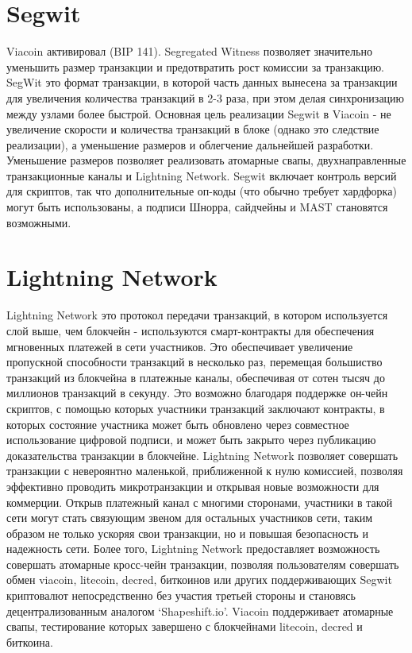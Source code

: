 \documentclass{article}
\begin{document}
\section{Segwit}\label{sec: Segwit}
Viacoin активировал \cite{segwit} (BIP 141). Segregated Witness позволяет
значительно уменьшить размер транзакции и предотвратить рост комиссии за транзакцию.
SegWit это формат транзакции, в которой часть данных вынесена за транзакции для
увеличения количества транзакций в 2-3 раза, при этом делая синхронизацию между
узлами более быстрой.
\newline \newline \noindent
Основная цель реализации Segwit в Viacoin - не увеличение скорости и количества
транзакций в блоке (однако это следствие реализации), а уменьшение размеров
 и облегчение дальнейшей разработки. Уменьшение размеров позволяет реализовать
 \cite{atomic}атомарные свапы, двухнаправленные транзакционные каналы и Lightning Network.
\newline \newline \noindent
Segwit включает контроль версий для скриптов, так что дополнительные оп-коды
(что обычно требует хардфорка) могут быть использованы, а подписи Шнорра,
сайдчейны и MAST становятся возможными.

\section{Lightning Network}\label{sec: The Lightning Network}
\cite{lightningNetwork} Lightning Network это протокол передачи транзакций, в котором используется
слой выше, чем блокчейн - используются смарт-контракты для обеспечения мгновенных
платежей в сети участников.
Это обеспечивает увеличение пропускной способности транзакций в несколько раз,
перемещая большиство транзакций из блокчейна в платежные каналы, обеспечивая
от сотен тысяч до миллионов транзакций в секунду. Это возможно благодаря поддержке
он-чейн скриптов, с помощью которых участники транзакций заключают контракты, в которых
состояние участника может быть обновлено через совместное использование цифровой
подписи, и может быть закрыто через публикацию доказательства транзакции в блокчейне.
\newline \newline \noindent
Lightning Network позволяет совершать транзакции с невероянтно маленькой, приближенной к нулю комиссией, позволяя эффективно проводить микротранзакции и открывая новые возможности для коммерции. Открыв платежный канал с многими сторонами, участники в такой сети могут стать связующим звеном для остальных участников сети, таким образом не только ускоряя свои транзакции, но и повышая безопасность и надежность сети.
\newline \newline \noindent
Более того, Lightning Network предоставляет возможность совершать атомарные кросс-чейн транзакции, позволяя пользователям совершать обмен viacoin, litecoin, decred, биткоинов или других поддерживающих Segwit криптовалют непосредственно без участия третьей стороны и становясь децентрализованным аналогом `Shapeshift.io'. Viacoin поддерживает атомарные свапы, тестирование которых завершено \cite{viaatomic} с блокчейнами litecoin, decred и биткоина.
\newpage
\end{document}
